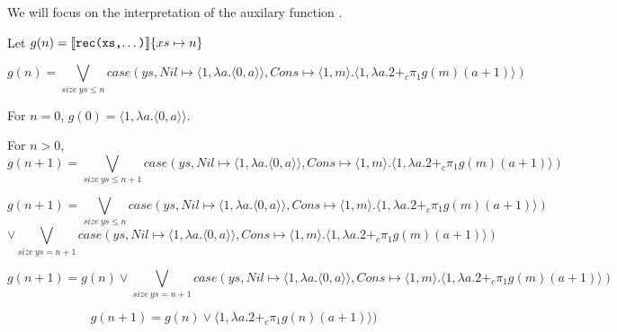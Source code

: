 We will focus on the interpretation of the auxilary function .

Let $g(n) = \llbracket \texttt{rec(xs,$\dots$)} \rrbracket \{xs \mapsto n\}$

\[g(n) = \bigvee_{size\ ys \leq n} case(ys, Nil \mapsto \langle1,\lambda a.\langle 0,a\rangle\rangle, Cons \mapsto \langle 1,m \rangle.\langle 1, \lambda a. 2 +_c \pi_1g(m) (a+1)\rangle)\]

For $n=0$, $g(0) = \langle 1,\lambda a.\langle 0,a\rangle\rangle$.

For $n>0$,
\[g(n+1) = \bigvee_{size\ ys \leq n+1} case(ys, Nil \mapsto \langle1,\lambda a.\langle 0,a\rangle\rangle, Cons \mapsto \langle 1,m \rangle.\langle 1, \lambda a. 2 +_c \pi_1g(m) (a+1)\rangle)\]

\[ g(n+1) = \bigvee_{size\ ys \leq n} case(ys, Nil \mapsto \langle1,\lambda a.\langle 0,a\rangle\rangle, Cons \mapsto \langle 1,m \rangle.\langle 1, \lambda a. 2 +_c \pi_1g(m) (a+1)\rangle) \]
\[ \vee \bigvee_{size\ ys = n+1} case(ys, Nil \mapsto \langle1,\lambda a.\langle 0,a\rangle\rangle, Cons \mapsto \langle 1,m \rangle.\langle 1, \lambda a. 2 +_c \pi_1g(m) (a+1)\rangle) \]
 
\[ g(n+1) = g(n) \vee \bigvee_{size\ ys = n+1} case(ys, Nil \mapsto \langle1,\lambda a.\langle 0,a\rangle\rangle, Cons \mapsto \langle 1,m \rangle.\langle 1, \lambda a. 2 +_c \pi_1g(m) (a+1)\rangle) \]

\[ g(n+1) = g(n) \vee \langle 1, \lambda a. 2 +_c \pi_1g(n) (a+1)\rangle)\]

